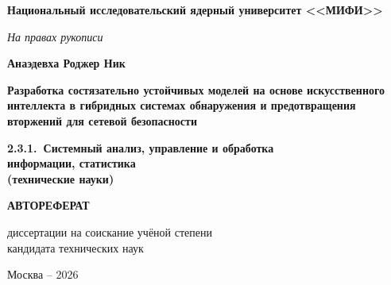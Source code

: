 \documentclass[12pt,a5paper]{article}
\begin{document}
\sloppy

\thispagestyle{empty}

\begin{center}
\textbf{Национальный исследовательский ядерный университет <<МИФИ>>}

\vspace{1cm}

\textit{На правах рукописи}

\vspace{2cm}

\textbf{Анаэдевха Роджер Ник}

\vspace{1.5cm}

{\large \textbf{Разработка состязательно устойчивых
моделей на основе искусственного интеллекта в гибридных
системах обнаружения и предотвращения вторжений для
сетевой безопасности}}

\vspace{1.5cm}

\textbf{2.3.1.\ Системный анализ, управление и обработка\\
информации, статистика\\
(технические науки)}

\vspace{2cm}

\textbf{АВТОРЕФЕРАТ}

\vspace{0.5cm}

диссертации на соискание учёной степени\\
кандидата технических наук

\vfill

Москва -- 2026
\end{center}

\newpage

\thispagestyle{empty}
\enlargethispage{1.5cm}
\end{document}
